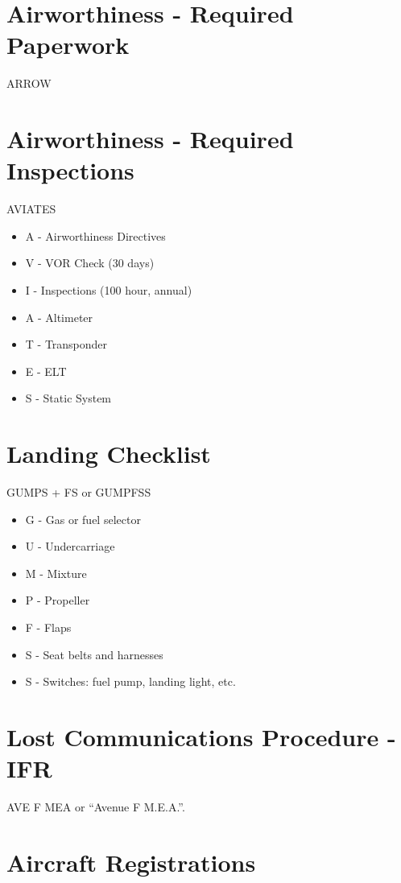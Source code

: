 \section{Airworthiness - Required Paperwork}

ARROW

\section{Airworthiness - Required Inspections}

AVIATES

\begin{itemize}
\item A - Airworthiness Directives
\item V - VOR Check (30 days)
\item I - Inspections (100 hour, annual)
\item A - Altimeter
\item T - Transponder
\item E - ELT
\item S - Static System
\end{itemize}

\section{Landing Checklist}

GUMPS + FS or GUMPFSS

\begin{itemize}
\item G - Gas or fuel selector
\item U - Undercarriage
\item M - Mixture
\item P - Propeller
\item F - Flaps
\item S - Seat belts and harnesses
\item S - Switches: fuel pump, landing light, etc.
\end{itemize}

\section{Lost Communications Procedure - IFR}

AVE F MEA or ``Avenue F M.E.A.''.

\section{Aircraft Registrations}

